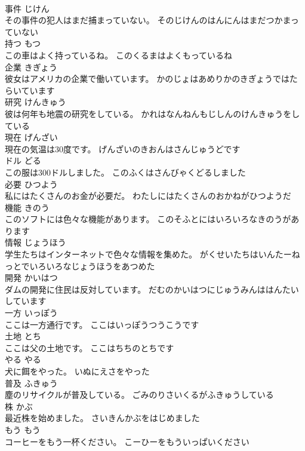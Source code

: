 \documentclass[8pt]{extreport}
\begin{document}
\begin{CJK}{UTF8}{min}
\\	事件	じけん	
\\	その事件の犯人はまだ捕まっていない。	そのじけんのはんにんはまだつかまっていない	
\\	持つ	もつ	
\\	この車はよく持っているね。	このくるまはよくもっているね	
\\	企業	きぎょう	
\\	彼女はアメリカの企業で働いています。	かのじょはあめりかのきぎょうではたらいています	
\\	研究	けんきゅう	
\\	彼は何年も地震の研究をしている。	かれはなんねんもじしんのけんきゅうをしている	
\\	現在	げんざい	
\\	現在の気温は30度です。	げんざいのきおんはさんじゅうどです	
\\	ドル	どる	
\\	この服は300ドルしました。	このふくはさんびゃくどるしました	
\\	必要	ひつよう	
\\	私にはたくさんのお金が必要だ。	わたしにはたくさんのおかねがひつようだ	
\\	機能	きのう	
\\	このソフトには色々な機能があります。	このそふとにはいろいろなきのうがあります	
\\	情報	じょうほう	
\\	学生たちはインターネットで色々な情報を集めた。	がくせいたちはいんたーねっとでいろいろなじょうほうをあつめた	
\\	開発	かいはつ	
\\	ダムの開発に住民は反対しています。	だむのかいはつにじゅうみんははんたいしています	
\\	一方	いっぽう	
\\	ここは一方通行です。	ここはいっぽうつうこうです	
\\	土地	とち	
\\	ここは父の土地です。	ここはちちのとちです	
\\	やる	やる	
\\	犬に餌をやった。	いぬにえさをやった	
\\	普及	ふきゅう	
\\	塵のリサイクルが普及している。	ごみのりさいくるがふきゅうしている	
\\	株	かぶ	
\\	最近株を始めました。	さいきんかぶをはじめました	
\\	もう	もう	
\\	コーヒーをもう一杯ください。	こーひーをもういっぱいください	

\end{CJK}
\end{document}
